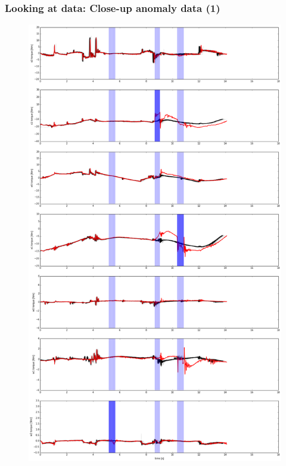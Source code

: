 \documentclass{beamer}
\newcommand{\datawidth}{.43\textwidth}
\begin{document}
    \begin{frame}
        \frametitle{Looking at data: Close-up anomaly data (1)}
        \begin{figure}
            \centering
            \includegraphics[width=\datawidth]{figs/anomaly12.png}
        \end{figure}
    \end{frame}
\end{document}
